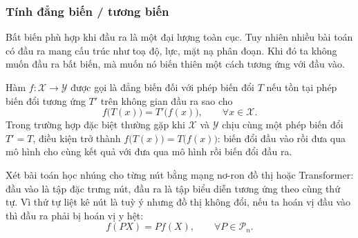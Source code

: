 \subsubsection{Tính đẳng biến / tương biến}
\label{ssub:equivariance}
 
Bất biến phù hợp khi đầu ra là một đại lượng toàn cục. Tuy nhiên nhiều bài toán có đầu ra mang cấu trúc như toạ độ, lực, mặt nạ phân đoạn. Khi đó ta không muốn đầu ra bất biến, mà muốn nó biến thiên một cách tương ứng với đầu vào.
 
\begin{definition}
\label{def:dang-bien}
Hàm $f:\mathcal{X}\to\mathcal{Y}$ được gọi là đẳng biến đối với phép biến đổi $T$ nếu tồn tại phép biến đổi tương ứng $T'$ trên không gian đầu ra sao cho~\cite{cohen2016group}
\begin{equation}
\label{eq:equivariance}
f\bigl(T(x)\bigr) = T'\bigl(f(x)\bigr), \qquad \forall x\in\mathcal{X}.
\end{equation}
Trong trường hợp đặc biệt thường gặp khi $\mathcal{X}$ và $\mathcal{Y}$ chịu
cùng một phép biến đổi $T'=T$, điều kiện trở thành $f\bigl(T(x)\bigr)=T\bigl(f(x)\bigr)$: biến đổi đầu vào rồi đưa qua mô hình cho cùng kết quả với đưa qua mô hình rồi biến đổi đầu ra.
\end{definition}
 
\begin{example}
\label{vd:node-equiv}
Xét bài toán học nhúng cho từng nút bằng mạng nơ-ron đồ thị hoặc Transformer: đầu vào là tập đặc trưng nút, đầu ra là tập biểu diễn tương ứng theo cùng thứ tự. Vì thứ tự liệt kê nút là tuỳ ý nhưng đồ thị không đổi, nếu ta hoán vị đầu vào thì đầu ra phải bị hoán vị y hệt:
\begin{equation}
f(PX) = P f(X), \qquad \forall P\in\mathcal{P}_n .
\end{equation}
\end{example}

